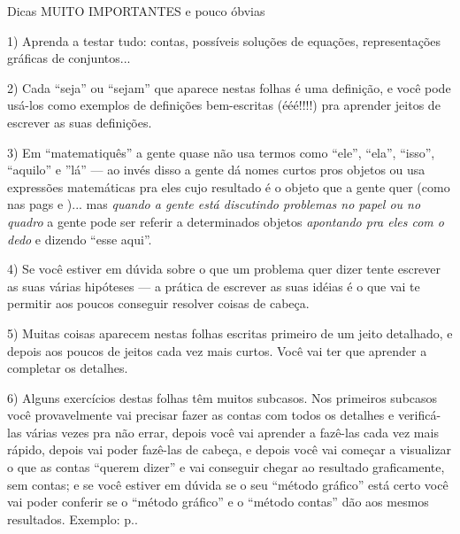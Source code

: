 \documentclass[oneside]{book}
\begin{document}
\newpage

%
 {Dicas MUITO IMPORTANTES e pouco óbvias}

1) Aprenda a testar tudo: contas, possíveis soluções de equações,
representações gráficas de conjuntos...

2) Cada ``seja'' ou ``sejam'' que aparece nestas folhas é uma
definição, e você pode usá-los como exemplos de definições
bem-escritas (ééé!!!!) pra aprender jeitos de escrever as suas
definições.

3) Em ``matematiquês'' a gente quase não usa termos como ``ele'',
``ela'', ``isso'', ``aquilo'' e ''lá'' --- ao invés disso a gente dá
nomes curtos pros objetos ou usa expressões matemáticas pra eles cujo
resultado é o objeto que a gente quer (como nas pags
\pageref{comprehension-ex123} e \pageref{projecoes})... mas {\sl
  quando a gente está discutindo problemas no papel ou no quadro} a
gente pode ser referir a determinados objetos {\sl apontando pra eles
  com o dedo} e dizendo ``esse aqui''.

4) Se você estiver em dúvida sobre o que um problema quer dizer tente
escrever as suas várias hipóteses --- a prática de escrever as suas
idéias é o que vai te permitir aos poucos conseguir resolver coisas de
cabeça.

5) Muitas coisas aparecem nestas folhas escritas primeiro de um jeito
detalhado, e depois aos poucos de jeitos cada vez mais curtos. Você
vai ter que aprender a completar os detalhes.

6) Alguns exercícios destas folhas têm muitos subcasos. Nos primeiros
subcasos você provavelmente vai precisar fazer as contas com todos os
detalhes e verificá-las várias vezes pra não errar, depois você vai
aprender a fazê-las cada vez mais rápido, depois vai poder fazê-las de
cabeça, e depois você vai começar a visualizar o que as contas
``querem dizer'' e vai conseguir chegar ao resultado graficamente, sem
contas; e se você estiver em dúvida se o seu ``método gráfico'' está
certo você vai poder conferir se o ``método gráfico'' e o ``método
contas'' dão aos mesmos resultados. Exemplo:
p.\pageref{sistemas-de-coordenadas}.
\end{document}
